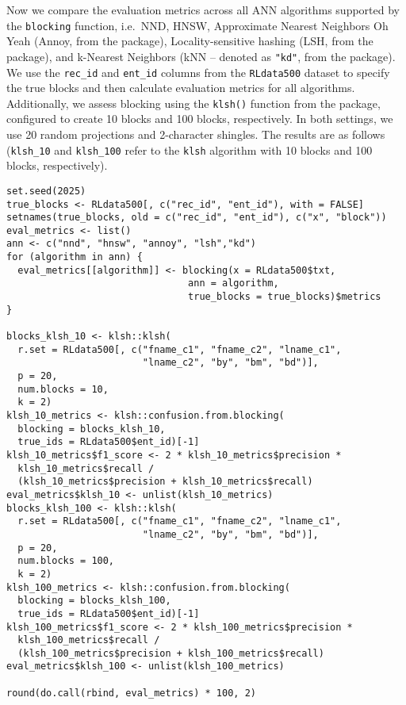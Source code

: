 Now we compare the evaluation metrics across all ANN algorithms
supported by the \texttt{blocking} function, i.e.~NND, HNSW, Approximate
Nearest Neighbors Oh Yeah (Annoy, from the  package),
Locality-sensitive hashing (LSH, from the  package), and
k-Nearest Neighbors (kNN -- denoted as \texttt{"kd"}, from the 
package). We use the \texttt{rec\_id} and \texttt{ent\_id} columns from the \texttt{RLdata500}
dataset to specify the true blocks and then calculate evaluation metrics
for all algorithms. Additionally, we assess blocking using the \texttt{klsh()}
function from the  package, configured to create 10 blocks
and 100 blocks, respectively. In both settings, we use 20 random
projections and 2-character shingles. The results are as follows
(\texttt{klsh\_10} and \texttt{klsh\_100} refer to the \texttt{klsh} algorithm with 10 blocks
and 100 blocks, respectively).

\begin{verbatim}
set.seed(2025)
true_blocks <- RLdata500[, c("rec_id", "ent_id"), with = FALSE]
setnames(true_blocks, old = c("rec_id", "ent_id"), c("x", "block"))
eval_metrics <- list()
ann <- c("nnd", "hnsw", "annoy", "lsh","kd")
for (algorithm in ann) {
  eval_metrics[[algorithm]] <- blocking(x = RLdata500$txt,
                                ann = algorithm,
                                true_blocks = true_blocks)$metrics
}

blocks_klsh_10 <- klsh::klsh(
  r.set = RLdata500[, c("fname_c1", "fname_c2", "lname_c1",
                        "lname_c2", "by", "bm", "bd")],
  p = 20,
  num.blocks = 10,
  k = 2)
klsh_10_metrics <- klsh::confusion.from.blocking(
  blocking = blocks_klsh_10, 
  true_ids = RLdata500$ent_id)[-1]
klsh_10_metrics$f1_score <- 2 * klsh_10_metrics$precision *
  klsh_10_metrics$recall / 
  (klsh_10_metrics$precision + klsh_10_metrics$recall)
eval_metrics$klsh_10 <- unlist(klsh_10_metrics)
blocks_klsh_100 <- klsh::klsh(
  r.set = RLdata500[, c("fname_c1", "fname_c2", "lname_c1",
                        "lname_c2", "by", "bm", "bd")],
  p = 20,
  num.blocks = 100,
  k = 2)
klsh_100_metrics <- klsh::confusion.from.blocking(
  blocking = blocks_klsh_100, 
  true_ids = RLdata500$ent_id)[-1]
klsh_100_metrics$f1_score <- 2 * klsh_100_metrics$precision * 
  klsh_100_metrics$recall /
  (klsh_100_metrics$precision + klsh_100_metrics$recall)
eval_metrics$klsh_100 <- unlist(klsh_100_metrics)

round(do.call(rbind, eval_metrics) * 100, 2)
\end{verbatim}


